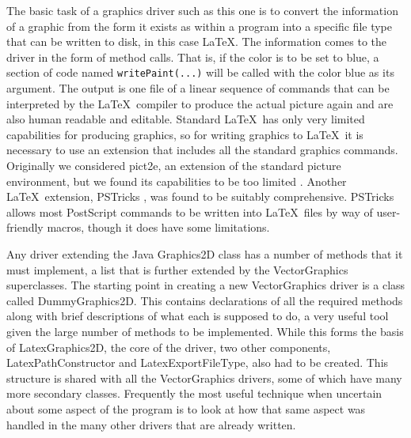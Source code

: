 \documentclass[11pt]{report}
\begin{document}
The basic task of a graphics driver such as this one is to convert the information of a graphic from the form it exists as within a program into a specific file type that can be written to disk, in this case \LaTeX. The information comes to the driver in the form of method calls. That is, if the color is to be set to blue, a section of code named \texttt{writePaint(...)} will be called with the color blue as its argument. The output is one file of a linear sequence of commands that can be interpreted by the \LaTeX\ compiler to produce the actual picture again and are also human readable and editable. Standard \LaTeX\ has only very limited capabilities for producing graphics, so for writing graphics to \LaTeX\ it is necessary to use an extension that includes all the standard graphics commands. Originally we considered pict2e, an extension of the standard \textsf{picture} environment, but we found its capabilities to be too limited \cite{pict}. Another \LaTeX\ extension, PSTricks \cite{zandt}, was found to be suitably comprehensive. PSTricks allows most PostScript commands to be written into \LaTeX\ files by way of user-friendly macros, though it does have some limitations.

Any driver extending the Java Graphics2D class has a number of methods that it must implement, a list that is further extended by the VectorGraphics superclasses. The starting point in creating a new VectorGraphics driver is a class called DummyGraphics2D. This contains declarations of all the required methods along with brief descriptions of what each is supposed to do, a very useful tool given the large number of methods to be implemented. While this forms the basis of LatexGraphics2D, the core of the driver, two other components, LatexPathConstructor and LatexExportFileType, also had to be created. This structure is shared with all the VectorGraphics drivers, some of which have many more secondary classes. Frequently the most useful technique when uncertain about some aspect of the program is to look at how that same aspect was handled in the many other drivers that are already written.
\end{document}

